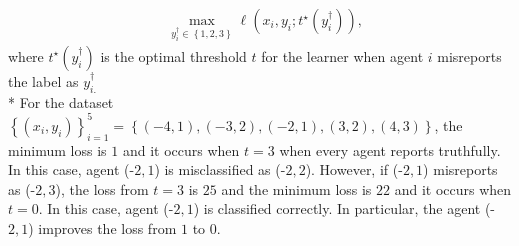 \documentclass{article}
\begin{document}
\begin{align*}
&\displaystyle\max_{y^{\dagger}_{i} \in \left\{1, 2, 3\right\}} \ell\left(x_{i}, y_{i}; t^\star \left(y^{\dagger}_{i}\right)\right),
\end{align*}
where $t^\star \left(y^{\dagger}_{i}\right)$ is the optimal threshold $t $ for the learner when agent $i $ misreports the label as $y^{\dagger}_{i.}$
\\* For the dataset $\left\{\left(x_{i}, y_{i}\right)\right\}_{i=1}^{5} = \left\{\left(-4, 1\right), \left(-3, 2\right), \left(-2, 1\right), \left(3, 2\right), \left(4, 3\right)\right\}$, the minimum loss is $1$ and it occurs when $t  = 3$ when every agent reports truthfully. In this case, agent (-$2, 1$) is misclassified as (-$2, 2$). However, if (-$2, 1$) misreports as (-$2, 3$), the loss from $t  = 3$ is $25$ and the minimum loss is $22$ and it occurs when $t  = 0$. In this case, agent (-$2, 1$) is classified correctly. In particular, the agent (-$2, 1$) improves the loss from $1$ to $0$.
\newline \newline

\begin{figure}[H] \centering {} \label{fig:1dat}
\end{figure}
\end{document}
